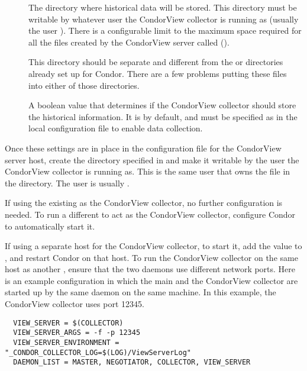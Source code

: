 \begin{description}

\item[] The directory where
historical data will be stored.
This directory must be writable by whatever user the CondorView
collector is running as (usually the user ).  
There is a configurable limit to the maximum space required for all
the files created by the CondorView server called
(). 

\Note This directory should be separate and different from the
 or  directories already set up for
Condor.
There are a few problems putting these files into either of those
directories.

\item[] A boolean value that determines
if the CondorView collector should store the historical information.
It is  by default, and must be specified as  in
the local configuration file to enable data collection.

\end{description}

Once these settings are in place in the configuration file for the
CondorView server host, create the directory specified
in  and make it writable by the user the
CondorView collector is running as.
This is the same user that owns the  file in
the  directory. The user is usually .

If using the existing  as the CondorView collector,
no further configuration is needed.  
To run a different
 to act as the CondorView collector, configure
Condor to automatically start it.

If using a separate host for the CondorView collector,
to start it, add the value  to
, and restart Condor on that host.
To run the CondorView collector on the same host as another 
,
ensure that the two  daemons use different network ports.
Here is an example configuration in which the main  and the
CondorView collector are started up by the same  daemon on
the same machine.  In this example, the CondorView collector uses
port 12345.

\footnotesize
\begin{verbatim}
  VIEW_SERVER = $(COLLECTOR)
  VIEW_SERVER_ARGS = -f -p 12345
  VIEW_SERVER_ENVIRONMENT = "_CONDOR_COLLECTOR_LOG=$(LOG)/ViewServerLog"
  DAEMON_LIST = MASTER, NEGOTIATOR, COLLECTOR, VIEW_SERVER
\end{verbatim}
\normalsize


